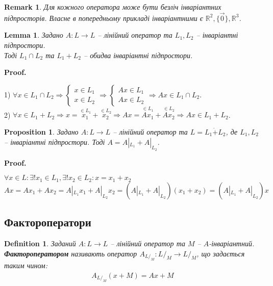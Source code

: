 \documentclass[a4paper, 10pt]{article}
\makeatletter
\theoremstyle{theoremdd}
\newtheorem{definition}[theorem]{Definition}
\newtheorem{proposition}[theorem]{Proposition}
\newtheorem{remark}[theorem]{Remark}
\newtheorem{lemma}[theorem]{Lemma}
\renewenvironment{proof}[1][Proof.\\]{\par
\pushQED{\hfill \qed}%
\normalfont \topsep6\p@\@plus6\p@\relax
\trivlist
\item\relax
{\bfseries
#1\@addpunct{.}}\hspace\labelsep\ignorespaces
}{%
\popQED\endtrivlist\@endpefalse
}
\makeatother
\begin{document}
\begin{remark}
Для кожного оператора може бути безліч інваріантних підпросторів. Власне в попередньому прикладі інваріантними є $\mathbb{R}^2, \{\vec{0}\}, \mathbb{R}^3$.
\end{remark}
\fi

\begin{lemma}
Задано $A \colon L \to L$ -- лінійний оператор та $L_1, L_2$ -- інваріантні підпростори.\\
Тоді $L_1 \cap L_2$ та $L_1 + L_2$ -- обидва інваріантні підпростори.
\end{lemma}

\begin{proof}
1) $\forall x \in L_1 \cap L_2 \Rightarrow \begin{cases} x \in L_1 \\ x \in L_2 \end{cases} \Rightarrow \begin{cases} Ax \in L_1 \\ Ax \in L_2 \end{cases} \Rightarrow Ax \in L_1 \cap L_2$.
\bigskip \\
2) $\forall x \in L_1 + L_2 \Rightarrow x = \overset{\in L_1}{x_1} + \overset{\in L_2}{x_2} \Rightarrow Ax = \overset{\in L_1}{A x_1} + \overset{\in L_2}{A x_2} \Rightarrow Ax \in L_1+L_2$.
\end{proof}

\begin{proposition}
Задано $A \colon L \to L$ -- лінійний оператор та $L = L_1 \dot{+} L_2$, де $L_1,L_2$ -- інваріантні підпростори. Тоді $A = A|_{L_1} + A|_{L_2}$.
\end{proposition}

\begin{proof}
$\forall x \in L: \exists! x_1 \in L_1, \exists! x_2 \in L_2: x = x_1 + x_2$\\
$Ax = Ax_1 + Ax_2 = A|_{L_1}x_1 + A|_{L_2}x_2 = (A|_{L_1}+A|_{L_2})(x_1 + x_2) = (A|_{L_1}+A|_{L_2})x$
\end{proof}

\subsection{Фактороператори}
\begin{definition}
Заданий $A \colon L \to L$ -- лінійний оператор та $M$ -- $A$-інваріантний.\\
\textbf{Фактороператором} називають оператор $A_{L/_M} \colon L/_M \to L/_M$, що задається таким чином:
\begin{align*}
A_{L/_M}(x + M) =  Ax + M
\end{align*}
\end{definition}
\end{document}
